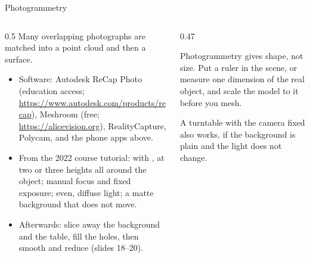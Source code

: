 \documentclass[aspectratio=169,11pt]{beamer}
\begin{document}
\begin{frame}{Photogrammetry}
\begin{columns}[T,onlytextwidth]
\begin{column}{0.5\textwidth}
\small Many overlapping photographs are matched into a point cloud and then a surface.
\begin{itemize}
  \item Software: Autodesk ReCap Photo (education access; \url{https://www.autodesk.com/products/recap}), Meshroom (free; \url{https://alicevision.org}), RealityCapture, Polycam, and the phone apps above.
  \item From the 2022 course tutorial:  with , at two or three heights all around the object; manual focus and fixed exposure; even, diffuse light; a matte background that does not move.
  \item Afterwards: slice away the background and the table, fill the holes, then smooth and reduce (slides 18--20).
\end{itemize}
\end{column}
\begin{column}{0.47\textwidth}
\begin{punchbox}
\small Photogrammetry gives shape, not size. Put a ruler in the scene, or measure one dimension of the real object, and scale the model to it before you mesh.
\end{punchbox}
\vspace{1mm}
\small A turntable with the camera fixed also works, if the background is plain and the light does not change.
\end{column}
\end{columns}
\end{frame}
\end{document}
